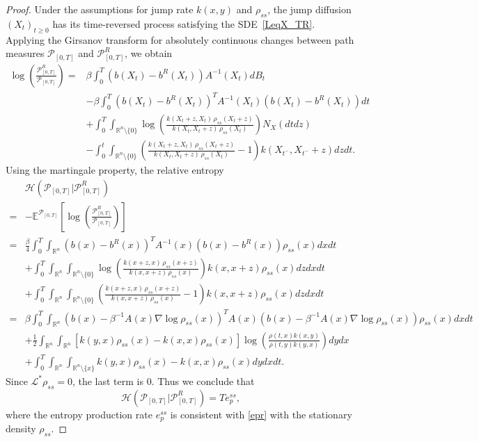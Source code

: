 \documentclass[10pt]{article}
\theoremstyle{definition}
\theoremstyle{remark}
\numberwithin{equation}{section}
\begin{document}
\begin{proof}
Under the assumptions for jump rate $k(x,y)$ and $\rho_{ss}$, the jump diffusion $(X_t)_{t \geq 0}$ has its time-reversed process satisfying the SDE~\eqref{LeqX_TR}.
Applying the Girsanov transform for absolutely continuous changes between path measures $\mathcal{P}_{[0,T]}$ and $\mathcal{P}^R_{[0,T]}$, we obtain
\begin{align}
    \log \left(\frac{\mathcal{P}^R_{[0,T]}}{\mathcal{P}_{[0,T]}}\right) = & \beta\int^T_0 (b(X_t) - b^{R}(X_t)) A^{-1}(X_t)dB_t \nonumber \\ 
    & -\beta\int^{T}_0(b(X_t)- b^{R}(X_t))^{T}A^{-1}(X_t)(b(X_t) - b^{R}(X_t))dt \nonumber \\
    & +  \int_0^T \int_{\mathbb{R}^n\setminus\{0\}} \log \left( \frac{k(X_t + z, X_t)\, \rho_{ss}(X_t + z)}{k(X_t, X_t+z)\, \rho_{ss}(X_t)} \right) N_X(dtdz) \nonumber \\
    & - \int_0^t \int_{\mathbb{R}^n\setminus\{0\}} \left(\frac{k(X_t + z, X_t)\, \rho_{ss}(X_t + z)}{k(X_t, X_t+z)\, \rho_{ss}(X_t)}-1 \right) k(X_{t^-}, X_{t^-}+z)dz dt.
\end{align}
Using the martingale property, the relative entropy
\begin{align*}
    & \mathcal{H}(\mathcal{P}_{[0,T]} | \mathcal{P}^R_{[0,T]}) \nonumber\\
    = & -\mathbb{E}^{\mathcal{P}_{[0,T]}} \left[ \log \left(\frac{\mathcal{P}^R_{[0,T]}}{\mathcal{P}_{[0,T]}}\right) \right] \nonumber \\
    =& \frac{\beta}{4}\int^{T}_0\int_{\mathbb{R}^n}(b(x)- b^{R}(x))^{T}A^{-1}(x)(b(x) - b^{R}(x))\rho_{ss}(x)dx dt  \\
    & + \int_0^T \int_{\mathbb{R}^n}\int_{\mathbb{R}^n\setminus\{0\}} \log \left( \frac{k(x + z, x)\, \rho_{ss}(x + z)}{k(x, x+z)\, \rho_{ss}(x)} \right) k(x,x+z)\rho_{ss}(x)dz dx dt\\
    & + \int_0^T \int_{\mathbb{R}^n} \int_{\mathbb{R}^n\setminus\{0\}} \left(\frac{k(x + z, x)\, \rho_{ss}(x + z)}{k(x,x+z)\, \rho_{ss}(x)}-1 \right) k(x,x+z) \rho_{ss}(x)dz dxdt  \\
    = & \beta\int_0^T\int_{\mathbb{R}^n} (b(x) - \beta^{-1} A(x)\nabla \log\rho_{ss}(x))^{T}A(x)(b(x) - \beta^{-1} A(x)\nabla \log\rho_{ss}(x)) \rho_{ss}(x)dxdt \\
    & +\frac{1}{2} \int_{\mathbb{R}^n}\int_{\mathbb{R}^n} [k(y, x)\rho_{ss}(x) - k(x,x) \rho_{ss}(x)]\log \left( \frac{\rho(t,x)k(x,y)}{\rho(t,y)k(y,x)} \right) dydx  \\
    & + \int_0^T \int_{\mathbb{R}^n}\int_{\mathbb{R}^n\setminus\{x\}} k(y, x)\rho_{ss}(x) - k(x,x) \rho_{ss}(x) dy dx dt.
\end{align*}
Since $\mathcal{L}^{\ast}\rho_{ss}=0$, the last term is $0$. Thus we conclude that
\begin{equation*}
    \mathcal{H}(\mathcal{P}_{[0,T]} | \mathcal{P}^R_{[0,T]}) = Te^{ss}_p,
\end{equation*}
where the entropy production rate $e^{ss}_{p}$ is consistent with \eqref{epr} with the stationary density $\rho_{ss}$.
\end{proof}
\end{document}
